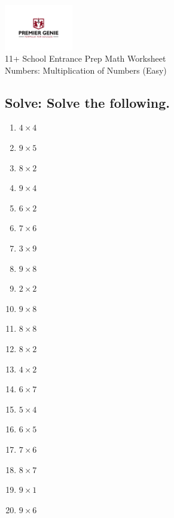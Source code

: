 \documentclass{article}
\begin{document}
\begin{center}
\includegraphics[width=3cm]{PREMGENIEJPG.jpg}\\
{\Large 11+ School Entrance Prep Math Worksheet}\\
{\Medium Numbers: Multiplication of Numbers (Easy)}\\

\end{center}

\subsection*{Solve: Solve the following.}

\begin{enumerate}
\item $\displaystyle {4}\times{4} $ \ 
\item $\displaystyle {9}\times{5} $ \ 
\item $\displaystyle {8}\times{2} $ \ 
\item $\displaystyle {9}\times{4} $ \ 
\item $\displaystyle {6}\times{2} $ \ 
\item $\displaystyle {7}\times{6} $ \ 
\item $\displaystyle {3}\times{9} $ \ 
\item $\displaystyle {9}\times{8} $ \ 
\item $\displaystyle {2}\times{2} $ \ 
\item $\displaystyle {9}\times{8} $ \ 
\item $\displaystyle {8}\times{8} $ \ 
\item $\displaystyle {8}\times{2} $ \ 
\item $\displaystyle {4}\times{2} $ \ 
\item $\displaystyle {6}\times{7} $ \ 
\item $\displaystyle {5}\times{4} $ \ 
\item $\displaystyle {6}\times{5} $ \ 
\item $\displaystyle {7}\times{6} $ \ 
\item $\displaystyle {8}\times{7} $ \ 
\item $\displaystyle {9}\times{1} $ \ 
\item $\displaystyle {9}\times{6} $ \ 


\end{enumerate}
\end{document}
